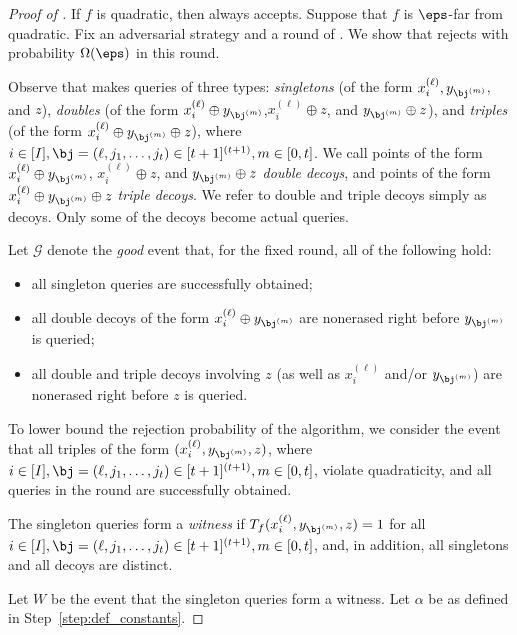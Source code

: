 \documentclass{toc}
\begin{document}
\begin{proof}[Proof of ] 



If $f$ is quadratic, then  always accepts. Suppose that $f$ is $\eps$-far from quadratic. Fix an adversarial strategy and a round of . We show that  rejects with probability  $\Omega(\eps)$ in this round.  

 Observe that  makes queries of three types: {\em singletons} (of the form $x_i^{(\ell)},y_{\bj^{(m)}}$, and $z$), {\em doubles} (of the form $x_i^{(\ell)}\oplus y_{\bj^{(m)}}$,$x_i^{(\ell)} \oplus z$, and $y_{\bj^{(m)}}\oplus z$), and {\em triples} (of the form $x_i^{(\ell)}\oplus y_{\bj^{(m)}}\oplus z$), where $i \in [I], \bj = (\ell, j_1, \dots, j_t) \in [t+1]^{(t+1)}, m \in [0, t]$.  We call points of the form $x_i^{(\ell)}\oplus y_{\bj^{(m)}}$, $x_i^{(\ell)} \oplus z$, and $y_{\bj^{(m)}}\oplus z$ {\em double decoys}, and points of the form $x_i^{(\ell)}\oplus y_{\bj^{(m)}} \oplus z$ {\em triple decoys}. We refer to double and triple decoys simply as decoys. Only some of the decoys become actual queries. 


Let $\mathcal{G}$ denote the {\em good} event that, for the fixed round, all of the following hold:
\begin{itemize}
    \item all singleton queries are successfully obtained; 
    \item all double decoys of the form $x_i^{(\ell)} \oplus y_{\bj^{(m)}}$ are nonerased right before $y_{\bj^{(m)}}$ is queried;
    \item all double and triple decoys involving $z$ (as well as $x_i^{(\ell)}$ and/or $y_{\bj^{(m)}}$) are nonerased right before $z$ is queried.
\end{itemize}


To lower bound the rejection probability of the algorithm, we consider the event that all triples of the form  $(x_i^{(\ell)}, y_{\bj^{(m)}}, z)$, where $i \in [I], \bj = (\ell, j_1, \dots, j_t) \in [t+1]^{(t+1)}, m \in [0, t]$, violate quadraticity, and all queries in the round are successfully obtained. 
 \begin{definition}[Witness]
The singleton queries form a \emph{witness} if $T_f(x_i^{(\ell)},y_{\bj^{(m)}}, z) = 1$ for all $i \in [I], \bj = (\ell, j_1, \dots, j_t) \in [t+1]^{(t+1)}, m \in [0, t]$, and, in addition, all singletons and all decoys are distinct. 
 \end{definition}
 Let $W$ be the event that the singleton queries form a witness. Let $\alpha$ be as defined in Step~\ref{step:def_constants}. 


\end{proof}
\end{document}
